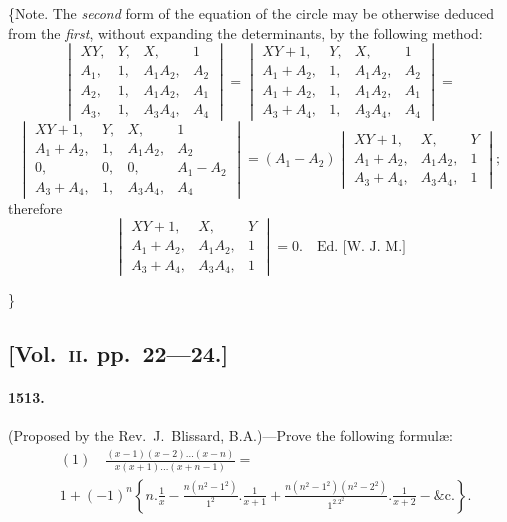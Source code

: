 \documentclass[11pt,a4paper]{article}
\begin{document}
\{Note. The \textit{second} form of the equation of the circle may be otherwise deduced
from the \textit{first}, without expanding the determinants, by the following method:
\[
\begin{vmatrix}
XY, & Y, & X, & 1 \\
A_1, & 1, & A_1A_2, & A_2 \\
A_2, & 1, & A_1A_2, & A_1 \\
A_3, & 1, & A_3A_4, & A_4
\end{vmatrix}
=
\begin{vmatrix}
XY+1, & Y, & X, & 1 \\
A_1+A_2, & 1, & A_1A_2, & A_2 \\
A_1+A_2, & 1, & A_1A_2, & A_1 \\
A_3+A_4, & 1, & A_3A_4, & A_4
\end{vmatrix}
=
\]
\[
\begin{vmatrix}
XY+1, & Y, & X, & 1 \\
A_1+A_2, & 1, & A_1A_2, & A_2 \\
0, & 0, & 0, & A_1-A_2 \\
A_3+A_4, & 1, & A_3A_4, & A_4
\end{vmatrix}
= (A_1-A_2)
\begin{vmatrix}
XY+1, & X, & Y \\
A_1+A_2, & A_1A_2, & 1 \\
A_3+A_4, & A_3A_4, & 1
\end{vmatrix};
\]
therefore
\[
\begin{vmatrix}
XY+1, & X, & Y \\
A_1+A_2, & A_1A_2, & 1 \\
A_3+A_4, & A_3A_4, & 1
\end{vmatrix} = 0.\quad\text{Ed. [W. J. M.]}
\]

\}


\subsection*{[Vol.~\textsc{ii}. pp.\ 22---24.]}

\paragraph*{1513.} (Proposed by the Rev.~J.~Blissard, B.A.)---Prove the following formul\ae:
\begin{align*}
&(1)\quad \frac{(x-1)(x-2)\ldots(x-n)}{x(x+1)\ldots(x+n-1)} = \\
&1 + (-1)^n\left\{n.\frac{1}{x} - \frac{n(n^2-1^2)}{1^2}.\frac{1}{x+1} + \frac{n(n^2-1^2)(n^2-2^2)}{1^2.2^2}.\frac{1}{x+2} - \&\text{c.}\right\}.
\end{align*}
\end{document}
